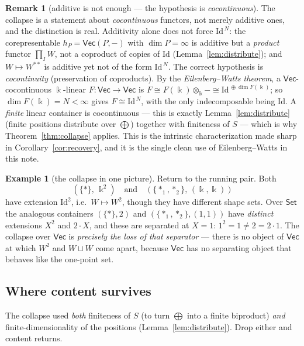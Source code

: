 \documentclass[11pt]{amsart}
\theoremstyle{plain}
\theoremstyle{definition}
\newtheorem{example}[theorem]{Example}
\newtheorem{remark}[theorem]{Remark}
\renewcommand{\Vec}{\mathsf{Vec}}
\newcommand{\Set}{\mathsf{Set}}
\newcommand{\Id}{\mathrm{Id}}
\newcommand{\fld}{\Bbbk}
\newcommand{\bul}{{-}}
\newcommand{\iso}{\cong}
\begin{document}
\begin{remark}[additive is not enough --- the hypothesis is \emph{cocontinuous}]\label{rem:cocont}
The collapse is a statement about \emph{cocontinuous} functors, not merely
additive ones, and the distinction is real. Additivity alone does not force
$\Id^{\,N}$: the corepresentable $h_P=\Vec(P,\bul)$ with $\dim P=\infty$ is
additive but a \emph{product} functor $\prod_I W$, not a coproduct of copies of
$\Id$ (Lemma~\ref{lem:distribute}); and $W\mapsto W^{**}$ is additive yet not of
the form $\Id^{\,N}$. The correct hypothesis is \emph{cocontinuity}
(preservation of coproducts). By the \emph{Eilenberg--Watts theorem}, a
$\Vec$-cocontinuous $\fld$-linear $F\colon\Vec\to\Vec$ is
$F\iso F(\fld)\otimes_\fld\bul\iso\Id^{\,\oplus\dim F(\fld)}$; so
$\dim F(\fld)=N<\infty$ gives $F\iso\Id^{\,N}$, with the only indecomposable
being $\Id$. A \emph{finite} linear container is cocontinuous --- this is
exactly Lemma~\ref{lem:distribute} (finite positions distribute over
$\bigoplus$) together with finiteness of $S$ --- which is why
Theorem~\ref{thm:collapse} applies. This is the intrinsic characterization made
sharp in Corollary~\ref{cor:recovery}, and it is the single clean use of
Eilenberg--Watts in this note.
\end{remark}

\begin{example}[the collapse in one picture]\label{ex:collapse}
Return to the running pair. Both
\[
  (\{*\},\,\fld^2)\quad\text{and}\quad(\{*_1,*_2\},\,(\fld,\fld))
\]
have extension $\Id^2$, i.e.\ $W\mapsto W^2$, though they have different shape
sets. Over $\Set$ the analogous containers $(\{*\},2)$ and
$(\{*_1,*_2\},(1,1))$ have \emph{distinct} extensions $X^2$ and $2\cdot X$, and
these are separated at $X=1$: $1^2=1\neq 2=2\cdot 1$. The collapse over $\Vec$
is \emph{precisely the loss of that separator} --- there is no object of $\Vec$
at which $W^2$ and $W\sqcup W$ come apart, because $\Vec$ has no separating
object that behaves like the one-point set.
\end{example}

\subsection{Where content survives}

The collapse used \emph{both} finiteness of $S$ (to turn $\bigoplus$ into a
finite biproduct) \emph{and} finite-dimensionality of the positions
(Lemma~\ref{lem:distribute}). Drop either and content returns.
\end{document}

